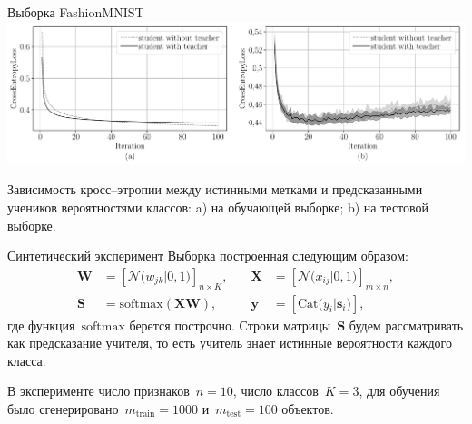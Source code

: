 \documentclass[9pt,pdf,hyperref={unicode}]{beamer}
\begin{document}
\begin{frame}{Выборка FashionMNIST}
\justifying
{\center
\includegraphics[width=1\textwidth]{figures/mnist_loss}
}

Зависимость кросс--этропии между истинными метками и предсказанными учеников вероятностями классов: a) на обучающей выборке; b) на тестовой выборке.
\end{frame}

\begin{frame}{Синтетический эксперимент}
\justifying
Выборка построенная следующим образом:
\[
\begin{aligned}
\mathbf{W} &= \left[\mathcal{N}\bigr(w_{jk}|0, 1\bigr)\right]_{n\times K}, \quad &\mathbf{X} &= \left[\mathcal{N}\bigr(x_{ij}|0, 1\bigr)\right]_{m\times n}, \\
 \mathbf{S} &= \text{softmax}\left(\mathbf{XW}\right), \quad &\mathbf{y} &= \left[\text{Cat}\bigr(y_i| \mathbf{s}_i\bigr)\right],
\end{aligned}
\]
где функция~$\text{softmax}$ берется построчно. Строки матрицы~$\mathbf{S}$ будем рассматривать как предсказание учителя, то есть учитель знает истинные вероятности каждого класса.

В эксперименте число признаков~$n=10$, число классов~$K=3$, для обучения было сгенерировано~$m_{\text{train}}=1000$ и~$m_{\text{test}}=100$ объектов.
\end{frame}
\end{document}

